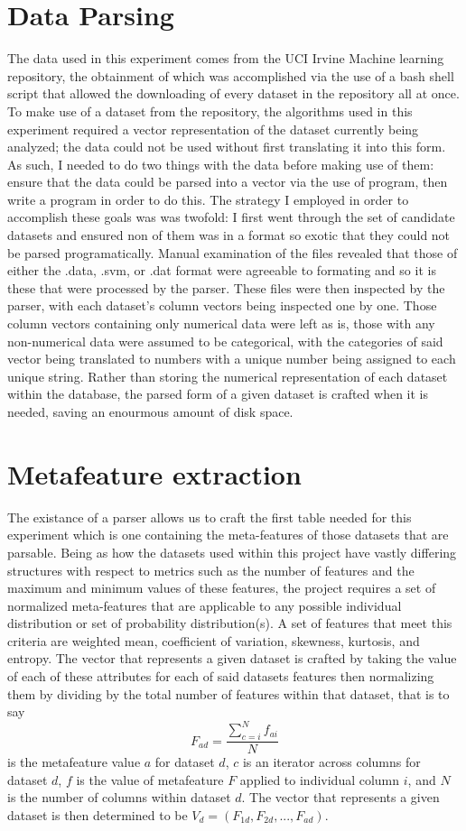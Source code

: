 \section{Data Parsing}
The data used in this experiment comes from the UCI Irvine Machine learning
repository, the obtainment of which was accomplished via the use of a bash
shell script that allowed the downloading of every dataset in the repository
all at once. To make use of a dataset from the repository, the algorithms used
in this experiment required a vector representation of the dataset currently
being analyzed; the data could not be used without first translating it into
this form. As such, I needed to do two things with the data before making use
of them: ensure that the data could be parsed into a vector via the use of program,
then write a program in order to do this. The strategy I employed in order to
accomplish these goals was was twofold: I first went through the set of candidate
datasets and ensured non of them was in a format so exotic that they could not
be parsed programatically. Manual examination of the files revealed that those
of either the .data, .svm, or .dat format were agreeable to formating and so it
is these that were processed by the parser. These files were then inspected by the
parser, with each dataset's column vectors being inspected one by one. Those
column vectors containing only numerical data were left as is, those with any
non-numerical data were assumed to be categorical, with the categories of said
vector being translated to numbers with a unique number being assigned to each
unique string. Rather than storing the numerical representation of each dataset
within the database, the parsed form of a given dataset is crafted when it is
needed, saving an enourmous amount of disk space.

\section{Metafeature extraction}
The existance of a parser allows us to craft the first table needed for this
experiment which is one containing the meta-features of those datasets that are
parsable. Being as how the datasets used within this project have vastly
differing structures with respect to metrics such as the number of features
and the maximum and minimum values of these features, the project requires a set
of normalized meta-features that are applicable to any possible individual
distribution or set of probability distribution(s). A set of features that meet
this criteria are weighted mean, coefficient of variation, skewness, kurtosis, and
entropy. The vector that represents a given dataset is crafted by taking the
value of each of these attributes for each of said datasets features then
normalizing them by dividing by the total number of features within that dataset,
that is to say
$$F_{ad} = \frac{\sum_{c=i}^{N}f_{ai}}{N}$$
is the metafeature value $a$ for dataset $d$, $c$ is an iterator across columns
for dataset $d$, $f$ is the value of metafeature $F$ applied to individual
column $i$, and $N$ is the number of columns within dataset $d$. The vector that
represents a given dataset is then determined to be
$V_d = (F_{1d}, F_{2d},..., F_{ad})$.

